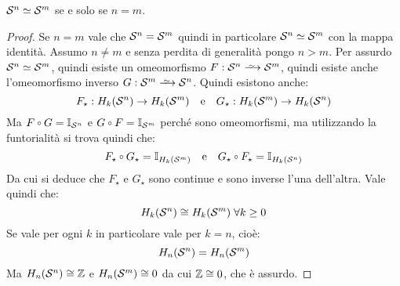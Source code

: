 \begin{corollary}
  $ \mathcal{S}^{n} \simeq \mathcal{S}^{m} $ se e solo se $ n = m $.
\end{corollary}
\begin{proof}
  Se $ n = m $ vale che $ \mathcal{S}^{n} = \mathcal{S}^{m} $ quindi in particolare
  $ \mathcal{S}^{n} \simeq \mathcal{S}^{m} $ con la mappa identità. Assumo $ n \not = m $ e senza
  perdita di generalità pongo $ n > m $. Per assurdo $ \mathcal{S}^{n} \simeq \mathcal{S}^{m} $,
  quindi esiste un omeomorfismo $ F: \Sph{n} \homoto \Sph{m} $, quindi esiste
  anche l'omeomorfismo inverso $ G: \Sph{m} \homoto \Sph{n} $. Quindi esistono
  anche:
  \[
    F_\star: H_k(\mathcal{S}^{n}) \to H_k(\mathcal{S}^{m}) \quad \text{e} \quad G_\star: H_k(\mathcal{S}^{m}) \to H_k(\mathcal{S}^{n})
  \]
  Ma $ F \circ G = \Id{\Sph{n}} $ e $ G \circ F = \Id{\Sph{m}} $ perché sono omeomorfismi,
  ma utilizzando la funtorialità si trova quindi che:
  \[
    F_\star \circ G_\star = \Id{H_k(\Sph{m})} \quad \text{e} \quad G_\star \circ F_\star = \Id{H_k(\Sph{n})}
  \]
  Da cui si deduce che $ F_\star $ e $ G_\star $ sono continue e sono inverse l'una
  dell'altra.
  Vale quindi che:
  \[
    H_k(\mathcal{S}^{n}) \cong H_k(\mathcal{S}^{m}) \; \forall k \geq 0
  \]
  Se vale per ogni $ k $ in particolare vale per $ k = n $, cioè:
  \[
    H_n(\mathcal{S}^{n}) = H_n(\mathcal{S}^{m})
  \]
  Ma $ H_n(\mathcal{S}^{n}) \cong \mathbb{Z} $ e $ H_n(\mathcal{S}^{m}) \cong 0 $ da cui $ \mathbb{Z} \cong 0 $, che è assurdo.
\end{proof}

